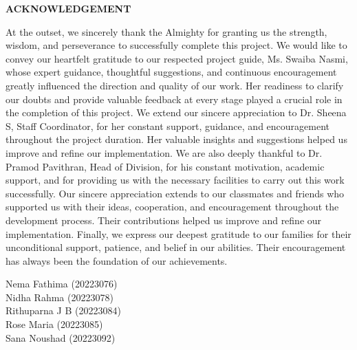 \clearpage
{}
{}
\thispagestyle{footeronly}

\begin{center}
{\Large \textbf{ACKNOWLEDGEMENT}}
\end{center}

\vspace{0.5cm}

At the outset, we sincerely thank the Almighty for granting us the strength, wisdom, and perseverance to successfully complete this project. We would like to convey our heartfelt gratitude to our respected project guide, Ms. Swaiba Nasmi, whose expert guidance, thoughtful suggestions, and continuous encouragement greatly influenced the direction and quality of our work. Her readiness to clarify our doubts and provide valuable feedback at every stage played a crucial role in the completion of this project. We extend our sincere appreciation to Dr. Sheena S, Staff Coordinator, for her constant support, guidance, and encouragement throughout the project duration. Her valuable insights and suggestions helped us improve and refine our implementation. We are also deeply thankful to Dr. Pramod Pavithran, Head of Division, for his constant motivation, academic support, and for providing us with the necessary facilities to carry out this work successfully. Our sincere appreciation extends to our classmates and friends who supported us with their ideas, cooperation, and encouragement throughout the development process. Their contributions helped us improve and refine our implementation. Finally, we express our deepest gratitude to our families for their unconditional support, patience, and belief in our abilities. Their encouragement has always been the foundation of our achievements.

\vspace{1cm}
Nema Fathima (20223076)\\
Nidha Rahma (20223078)\\
Rithuparna J B (20223084)\\
Rose Maria (20223085)\\
Sana Noushad (20223092)

\vfill
\clearpage
